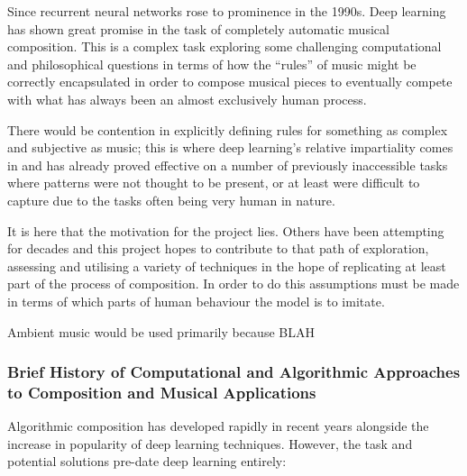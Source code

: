 \documentclass[12pt,]{article}
\begin{document}
Since recurrent neural networks rose to prominence in the 1990s. Deep
learning has shown great promise in the task of completely automatic
musical composition. This is a complex task exploring some challenging
computational and philosophical questions in terms of how the ``rules''
of music might be correctly encapsulated in order to compose musical
pieces to eventually compete with what has always been an almost
exclusively human process.

There would be contention in explicitly defining rules for something as
complex and subjective as music; this is where deep learning's relative
impartiality comes in and has already proved effective on a number of
previously inaccessible tasks where patterns were not thought to be
present, or at least were difficult to capture due to the tasks often
being very human in nature.

It is here that the motivation for the project lies. Others have been
attempting for decades and this project hopes to contribute to that path
of exploration, assessing and utilising a variety of techniques in the
hope of replicating at least part of the process of composition. In
order to do this assumptions must be made in terms of which parts of
human behaviour the model is to imitate.

Ambient music would be used primarily because BLAH

\hypertarget{brief-history-of-computational-and-algorithmic-approaches-to-composition-and-musical-applications}{%
\subsubsection{Brief History of Computational and Algorithmic Approaches
to Composition and Musical
Applications}\label{brief-history-of-computational-and-algorithmic-approaches-to-composition-and-musical-applications}}

Algorithmic composition has developed rapidly in recent years alongside
the increase in popularity of deep learning techniques. However, the
task and potential solutions pre-date deep learning entirely:
\end{document}
